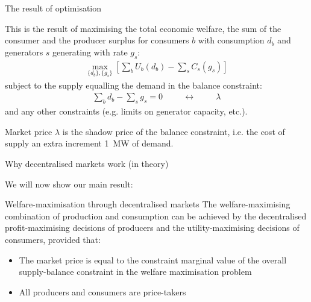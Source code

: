 \documentclass[10pt,aspectratio=169,dvipsnames]{beamer}
\def\l{\lambda}
\let\olditem\item
\renewcommand{\item}{%
\olditem\vspace{5pt}}
\begin{document}
\begin{frame}{The result of optimisation}

  This is the result of maximising the \alert{total economic welfare}, the sum of the consumer and the producer surplus for consumers $b$ with consumption $d_b$ and generators $s$ generating with rate $g_s$:
  \begin{align*}
    \max_{\{d_b\}, \{g_s\}}\left[ \sum_b U_b (d_b)  -  \sum_s C_s (g_s) \right]
  \end{align*}
  subject to the supply equalling the demand in the balance constraint:
  \begin{align*}
    \sum_b d_b -  \sum_s g_s  = 0 \hspace{1cm} \leftrightarrow \hspace{1cm} \l
  \end{align*}
  and any other constraints (e.g. limits on generator capacity, etc.).

  Market price $\l$ is the shadow price of the balance constraint,
  i.e. the cost of supply an extra increment 1~MW of demand.

\end{frame}


\begin{frame}{Why decentralised markets work (in theory)}

  We will now show our main result:

      \begin{alertblock}{Welfare-maximisation through decentralised markets}
        The welfare-maximising combination of production and consumption can be achieved by the decentralised profit-maximising decisions of producers and the utility-maximising decisions of consumers, provided that:
        \begin{itemize}
        \item The market price is equal to the constraint marginal value of the overall supply-balance constraint in the welfare maximisation problem
          \item All producers and consumers are price-takers
        \end{itemize}
      \end{alertblock}

\end{frame}
\end{document}
